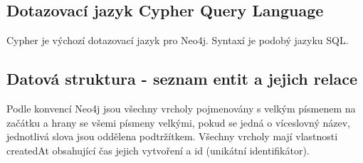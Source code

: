 \documentclass[12pt, a4paper,
 twoside,        %
 openright
]{report}
\begin{document}
    \subsection{Dotazovací jazyk Cypher Query Language}
        Cypher je výchozí dotazovací jazyk pro Neo4j. Syntaxí je podobý jazyku SQL.
        
    \subsection{Datová struktura - seznam entit a jejich relace}
        Podle konvencí Neo4j jsou všechny vrcholy pojmenovány s velkým písmenem na začátku a hrany se všemi písmeny velkými, pokud se jedná o víceslovný název, jednotlivá slova jsou oddělena podtržítkem.
            Všechny vrcholy mají vlastnosti createdAt obsahující čas jejich vytvoření a id (unikátní identifikátor).
\end{document}

